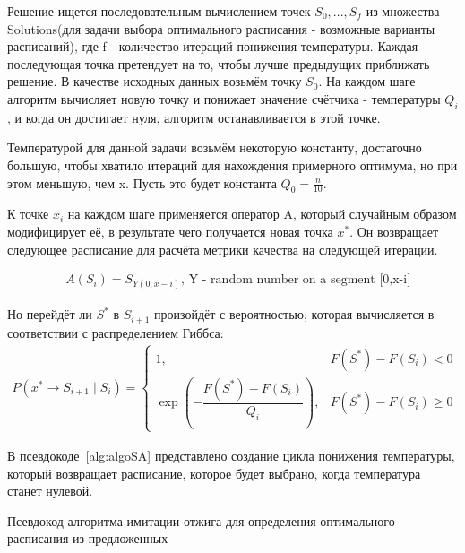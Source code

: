Решение ищется последовательным вычислением точек {$S_0,...,S_f$ } из множества Solutions(для задачи выбора оптимального расписания - возможные варианты расписаний), где f - количество итераций понижения температуры. Каждая последующая точка претендует на то, чтобы лучше предыдущих приближать решение. В качестве исходных данных возьмём точку {$S_0$}. На каждом шаге алгоритм вычисляет новую точку и понижает значение счётчика - температуры {$Q_i$ }, и когда он достигает нуля, алгоритм останавливается в этой точке.

Температурой для данной задачи возьмём некоторую константу, достаточно большую, чтобы хватило итераций для нахождения примерного оптимума, но при этом меньшую, чем x. Пусть это будет константа {$Q_0 = \frac {n}{10}$}.

К точке {$x_i$} на каждом шаге применяется оператор A, который случайным образом модифицирует её, в результате чего получается новая точка {$x^*$}. Он возвращает следующее расписание для расчёта метрики качества на следующей итерации.

\begin{align}
	& A(S_i)= S_{Y(0, x-i)}\text{, Y - random number on a segment [0,x-i]}
\end{align}

Но перейдёт ли  {$S^*$} в  {$S_{i+1}$} произойдёт с вероятностью, которая вычисляется в соответствии с распределением Гиббса:
\begin{align}
	P(x^*\to{S_{i+1}}\mid{S_i})=
	\begin{cases}
		1, & F({S^*})-F({S_i})<0 \\
		\exp\left(-\dfrac{F(S^*)-F(S_i)}{Q_i}\right), & {F(S^*)-F(S_i)\geqslant 0}
	\end{cases}
\end{align}

В псевдокоде~\ref{alg:algoSA} представлено создание цикла понижения температуры, который возвращает расписание, которое будет выбрано, когда температура станет нулевой. 

\begin{algorithm} 
	\nonl{}
	\caption{Псевдокод алгоритма имитации отжига для определения оптимального расписания из предложенных}\label{alg:algoSA}
\end{algorithm} 

